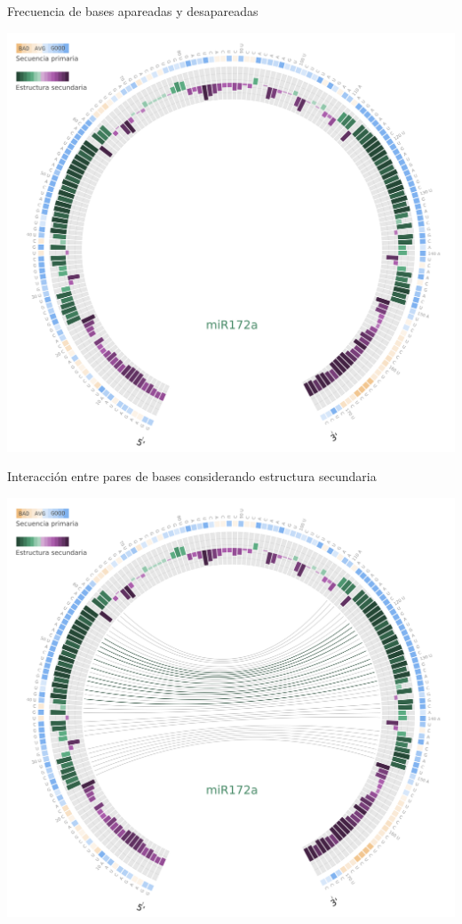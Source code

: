 \documentclass{beamer}
\begin{document}
\begin{frame}{Frecuencia de bases apareadas y desapareadas}
	\begin{center}
		\includegraphics[width=.8\textwidth]{img/miR172a_circos02.png}
	\end{center}
\end{frame}

\begin{frame}{Interacción entre pares de bases considerando estructura secundaria}
	\begin{center}
		\includegraphics[width=.8\textwidth]{img/miR172a_circos03.png}
	\end{center}
\end{frame}
\end{document}
